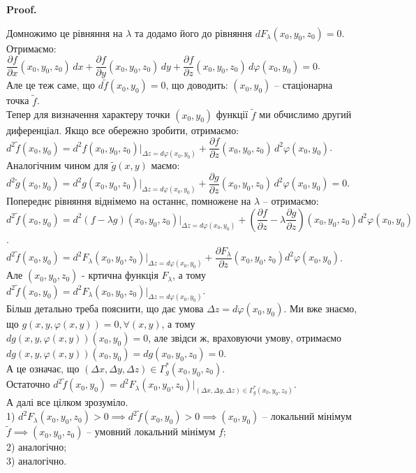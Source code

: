 \documentclass[a4paper, 10pt]{article}
\makeatletter
\def\departial#1#2{\dfrac{\partial {#1}}{\partial {#2}}}
\theoremstyle{theoremdd}
\theoremstyle{theoremdd}
\theoremstyle{theoremdd}
\theoremstyle{theoremdd}
\theoremstyle{theoremdd}
\theoremstyle{theoremdd}
\theoremstyle{theoremdd}
\theoremstyle{theoremdd}
\theoremstyle{theoremdd}
\renewenvironment{proof}[1][Proof.\\]{\par
\pushQED{\hfill \qed}%
\normalfont \topsep6\p@\@plus6\p@\relax
\trivlist
\item\relax
{\bfseries
#1\@addpunct{.}}\hspace\labelsep\ignorespaces
}{%
\popQED\endtrivlist\@endpefalse
}
\makeatother
\begin{document}
\begin{proof}
Домножимо це рівняння на $\lambda$ та додамо його до рівняння $dF_\lambda(x_0,y_0,z_0) = 0$. Отримаємо:\\
$\departial{f}{x}(x_0,y_0,z_0)\,dx + \departial{f}{y}(x_0,y_0,z_0)\,dy + \departial{f}{z}(x_0,y_0,z_0)\,d\varphi(x_0,y_0) = 0$.\\
Але це теж саме, що $d\tilde{f}(x_0,y_0) = 0$, що доводить: $(x_0,y_0)$ -- стаціонарна точка $\tilde{f}$.
\bigskip \\
Тепер для визначення характеру точки $(x_0,y_0)$ функції $\tilde{f}$ ми обчислимо другий диференціал. Якщо все обережно зробити, отримаємо:\\
$d^2 \tilde{f}(x_0,y_0) = d^2 f(x_0,y_0,z_0)|_{\Delta z = d\varphi(x_0,y_0)} + \departial{f}{z}(x_0,y_0,z_0) \, d^2\varphi(x_0,y_0)$.\\
Аналогічним чином для $\tilde{g}(x,y)$ маємо:\\
$d^2 \tilde{g}(x_0,y_0) = d^2 g(x_0,y_0,z_0)|_{\Delta z = d\varphi(x_0,y_0)} + \departial{g}{z}(x_0,y_0,z_0)\, d^2\varphi(x_0,y_0) = 0$.\\
Попереднє рівняння віднімемо на останнє, помножене на $\lambda$ -- отримаємо:\\
$d^2 \tilde{f}(x_0,y_0) = d^2 (f-\lambda g)(x_0,y_0,z_0)|_{\Delta z = d\varphi(x_0,y_0)} + \left( \departial{f}{z} - \lambda \departial{g}{z} \right)(x_0,y_0,z_0) d^2 \varphi(x_0,y_0)$.\\
$d^2 \tilde{f}(x_0,y_0) = d^2 F_\lambda (x_0,y_0,z_0) |_{\Delta z = d\varphi(x_0,y_0)} + \departial{F_\lambda}{z}(x_0,y_0,z_0) d^2 \varphi(x_0,y_0)$.\\
Але $(x_0,y_0,z_0)$ - кртична функція $F_\lambda$, а тому\\
$d^2 \tilde{f}(x_0,y_0) = d^2 F_\lambda(x_0,y_0,z_0) |_{\Delta z = d\varphi(x_0,y_0)}$.\\
Більш детально треба пояснити, що дає умова $\Delta z = d\varphi(x_0,y_0)$. Ми вже знаємо, що $g(x,y,\varphi(x,y)) = 0, \forall (x,y)$, а тому\\
$dg(x,y,\varphi(x,y))(x_0,y_0) = 0$, але звідси ж, враховуючи умову, отримаємо\\
$dg(x,y,\varphi(x,y))(x_0,y_0) = dg(x_0,y_0,z_0) = 0$.\\
А це означає, що $(\Delta x, \Delta y, \Delta z) \in \Gamma_g^*(x_0,y_0,z_0)$.\\
Остаточно $d^2 \tilde{f}(x_0,y_0) = d^2 F_\lambda(x_0,y_0,z_0) |_{(\Delta x, \Delta y, \Delta z) \in \Gamma_g^*(x_0,y_0,z_0)}$.\\
А далі все цілком зрозуміло.\\
1) $d^2 F_\lambda(x_0,y_0,z_0) > 0 \implies d^2 \tilde{f}(x_0,y_0) > 0 \implies (x_0,y_0)$ -- локальний мінімум $\tilde{f} \implies (x_0,y_0,z_0)$ -- умовний локальний мінімум $f$;\\
2) аналогічно;\\
3) аналогічно.
\end{proof}
\end{document}
